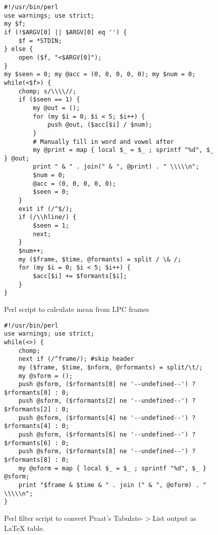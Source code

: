 \documentclass[11pt]{article}
\begin{document}
\begin{figure*}
\caption{Perl script to calculate mean from LPC frames}
\label{app:framemean}
\begin{small}
\begin{verbatim}
#!/usr/bin/perl
use warnings; use strict;
my $f;
if (!$ARGV[0] || $ARGV[0] eq '') {
    $f = *STDIN;
} else {
    open ($f, "<$ARGV[0]");
}
my $seen = 0; my @acc = (0, 0, 0, 0, 0); my $num = 0;
while(<$f>) {
    chomp; s/\\\\//;
    if ($seen == 1) {
        my @out = ();
        for (my $i = 0; $i < 5; $i++) {
            push @out, ($acc[$i] / $num);
        }
        # Manually fill in word and vowel after
        my @print = map { local $_ = $_ ; sprintf "%d", $_ } @out;
        print " & " . join(" & ", @print) . " \\\\\n";
        $num = 0;
        @acc = (0, 0, 0, 0, 0);
        $seen = 0;
    }
    exit if (/^$/);
    if (/\\hline/) {
        $seen = 1;
        next;
    }
    $num++;
    my ($frame, $time, @formants) = split / \& /;
    for (my $i = 0; $i < 5; $i++) {
        $acc[$i] += $formants[$i];
    }
}
\end{verbatim}
\end{small}
\end{figure*}

\begin{figure*}
\caption{Perl filter script to convert Praat's Tabulate-$>$List output as LaTeX table.}
\label{app:tabletotex}
\begin{small}
\begin{verbatim}
#!/usr/bin/perl
use warnings; use strict;
while(<>) {
    chomp;
    next if (/^frame/); #skip header
    my ($frame, $time, $nform, @rformants) = split/\t/;
    my @sform = ();
    push @sform, ($rformants[0] ne '--undefined--') ? $rformants[0] : 0;
    push @sform, ($rformants[2] ne '--undefined--') ? $rformants[2] : 0;
    push @sform, ($rformants[4] ne '--undefined--') ? $rformants[4] : 0;
    push @sform, ($rformants[6] ne '--undefined--') ? $rformants[6] : 0;
    push @sform, ($rformants[8] ne '--undefined--') ? $rformants[8] : 0;
    my @oform = map { local $_ = $_ ; sprintf "%d", $_ } @sform;
    print "$frame & $time & " . join (" & ", @oform) . " \\\\\n";
}
\end{verbatim}
\end{small}
\end{figure*}
\end{document}
